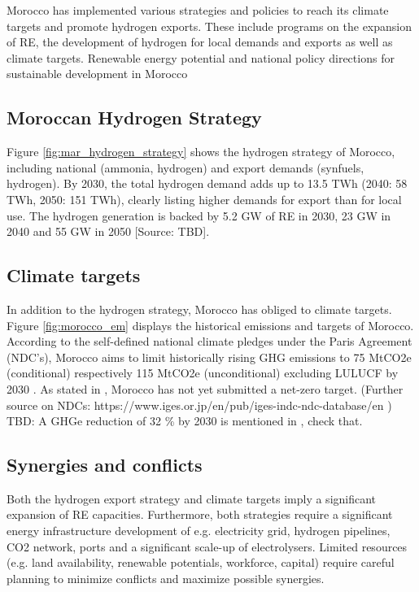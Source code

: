 Morocco has implemented various strategies and policies to reach its climate targets and promote hydrogen exports. These include programs on the expansion of RE, the development of hydrogen for local demands and exports as well as climate targets.
Renewable energy potential and national policy directions for sustainable development in Morocco \cite{Kousksou2015}


\subsection{Moroccan Hydrogen Strategy}
Figure \ref{fig:mar_hydrogen_strategy} shows the hydrogen strategy of Morocco, including
national (ammonia, hydrogen) and export demands (synfuels, hydrogen).
By 2030, the total hydrogen demand adds up to 13.5 TWh (2040: 58 TWh, 2050: 151 TWh), 
clearly listing higher demands for export than for local use. The hydrogen generation is backed by 5.2 GW of RE in 2030, 23 GW in 2040 and 55 GW in 2050 [Source: TBD].

\subsection{Climate targets}
In addition to the hydrogen strategy, Morocco has obliged to climate targets.
Figure \ref{fig:morocco_em} displays the historical emissions and targets of Morocco.
According to the self-defined national climate pledges under the Paris Agreement (NDC's), Morocco aims to limit historically rising GHG emissions to 75 MtCO2e (conditional) respectively 115 MtCO2e (unconditional) excluding LULUCF by 2030 \cite{CAT2021}. 
As stated in \cite{CAT2021}, Morocco has not yet submitted a net-zero target. (Further source on NDCs: https://www.iges.or.jp/en/pub/iges-indc-ndc-database/en )
TBD: A GHGe reduction of 32 \% by 2030 is mentioned in \cite[5]{Boulakhbar2020}, check that.

\subsection{Synergies and conflicts}
Both the hydrogen export strategy and climate targets imply a significant expansion of RE capacities. Furthermore, both strategies require a significant energy infrastructure development of e.g. electricity grid, hydrogen pipelines, CO2 network, ports and a significant scale-up of electrolysers.
Limited resources (e.g. land availability, renewable potentials, workforce, capital) require careful planning to minimize conflicts and maximize possible synergies.

